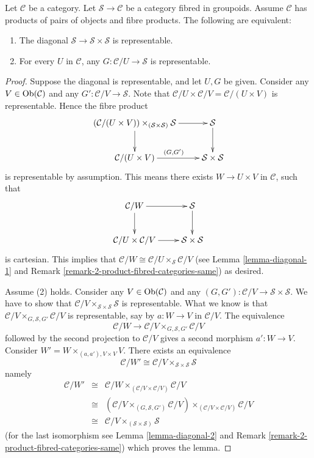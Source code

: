 \begin{lemma}
\label{lemma-representable-diagonal-groupoids}
Let $\mathcal{C}$ be a category.
Let $\mathcal{S} \to \mathcal{C}$ be a category fibred in groupoids.
Assume $\mathcal{C}$ has products of pairs of objects and fibre products.
The following are equivalent:
\begin{enumerate}
\item The diagonal $\mathcal{S} \to \mathcal{S} \times \mathcal{S}$
is representable.
\item For every $U$ in $\mathcal{C}$, any $G : \mathcal{C}/U \to \mathcal{S}$
is representable.
\end{enumerate}
\end{lemma}

\begin{proof}
Suppose the diagonal is representable, and let $U, G$ be given.
Consider any $V \in \mathop{\mathrm{Ob}}\nolimits(\mathcal{C})$ and any
$G' : \mathcal{C}/V \to \mathcal{S}$.
Note that $\mathcal{C}/U \times \mathcal{C}/V = \mathcal{C}/(U \times V)$
is representable. Hence the fibre product
$$
\xymatrix{
(\mathcal{C}/(U \times V))
\times_{(\mathcal{S} \times \mathcal{S})}
\mathcal{S}
\ar[r] \ar[d] &
\mathcal{S} \ar[d] \\
\mathcal{C}/(U \times V) \ar[r]^{(G, G')} &
\mathcal{S} \times \mathcal{S}
}
$$
is representable by assumption.
This means there exists $W \to U \times V$ in $\mathcal{C}$,
such that
$$
\xymatrix{
\mathcal{C}/W \ar[d] \ar[r] & \mathcal{S} \ar[d] \\
\mathcal{C}/U \times \mathcal{C}/V \ar[r] & \mathcal{S} \times \mathcal{S}
}
$$
is cartesian. This implies that
$\mathcal{C}/W \cong \mathcal{C}/U \times_\mathcal{S} \mathcal{C}/V$
(see Lemma \ref{lemma-diagonal-1} and
Remark \ref{remark-2-product-fibred-categories-same})
as desired.

\medskip\noindent
Assume (2) holds. Consider any $V \in \mathop{\mathrm{Ob}}\nolimits(\mathcal{C})$
and any $(G, G') : \mathcal{C}/V \to \mathcal{S} \times \mathcal{S}$.
We have to show that
$\mathcal{C}/V \times_{\mathcal{S} \times \mathcal{S}} \mathcal{S}$
is representable. What we know is that
$\mathcal{C}/V \times_{G, \mathcal{S}, G'} \mathcal{C}/V$
is representable, say by $a : W \to V$ in $\mathcal{C}/V$.
The equivalence
$$
\mathcal{C}/W \to \mathcal{C}/V \times_{G, \mathcal{S}, G'} \mathcal{C}/V
$$
followed by the second projection to $\mathcal{C}/V$ gives a
second morphism $a' : W \to V$. Consider
$W' = W \times_{(a, a'), V \times V} V$.
There exists an equivalence
$$
\mathcal{C}/W' \cong
\mathcal{C}/V \times_{\mathcal{S} \times \mathcal{S}} \mathcal{S}
$$
namely
\begin{eqnarray*}
\mathcal{C}/W' & \cong &
\mathcal{C}/W \times_{(\mathcal{C}/V \times \mathcal{C}/V)} \mathcal{C}/V \\
& \cong &
\left(\mathcal{C}/V \times_{(G, \mathcal{S}, G')} \mathcal{C}/V\right)
\times_{(\mathcal{C}/V \times \mathcal{C}/V)} \mathcal{C}/V \\
& \cong &
\mathcal{C}/V \times_{(\mathcal{S} \times \mathcal{S})} \mathcal{S}
\end{eqnarray*}
(for the last isomorphism see Lemma \ref{lemma-diagonal-2} and
Remark \ref{remark-2-product-fibred-categories-same})
which proves the lemma.
\end{proof}

